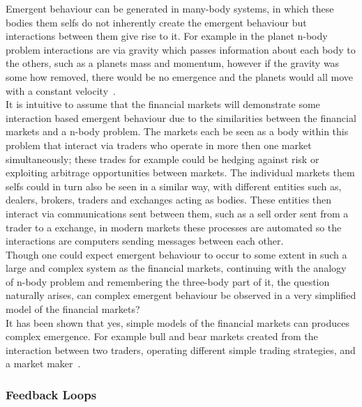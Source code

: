 \documentclass{article}
\begin{document}
Emergent behaviour can be generated in many-body systems, in which these bodies them selfs do not inherently create the emergent behaviour but interactions between them give rise to it. For example in the planet n-body problem interactions are via gravity which passes information about each body to the others, such as a planets mass and momentum, however if the gravity was some how removed, there would be no emergence and the planets would all move with a constant velocity~\cite{newtonconstantvelocity}.\\
It is intuitive to assume that the financial markets will demonstrate some interaction based emergent behaviour due to the similarities between the financial markets and a n-body problem. The markets each be seen as a body within this problem that interact via traders who operate in more then one market simultaneously; these trades for example could be hedging against risk or exploiting arbitrage opportunities between markets. The individual markets them selfs could in turn also be seen in a similar way, with different entities such as, dealers, brokers, traders and exchanges acting as bodies. These entities then interact via communications sent between them, such as a sell order sent from a trader to a exchange, in modern markets these processes are automated so the interactions are computers sending messages between each other.\\
Though one could expect emergent behaviour to occur to some extent in such a large and complex system as the financial markets, continuing with the analogy of n-body problem and remembering the three-body part of it, the question naturally arises, can complex emergent behaviour be observed in a very simplified model of the financial markets?\\
It has been shown that yes, simple models of the financial markets can produces complex emergence. For example bull and bear markets created from the interaction between two traders, operating different simple trading strategies, and a market maker~\cite{bearandbull}.








\subsubsection{Feedback Loops}
\end{document}
